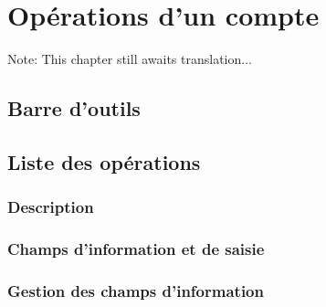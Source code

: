 
\chapter{Opérations d'un compte\label{transactions}}

Note: This chapter still awaits translation...


\section{Barre d'outils\label{transactions-functions}}


\section{Liste des opérations\label{transactions-list}}


\subsection{Description\label{transactions-list-description}}



\subsection{Champs d'information et de saisie\label{transactions-list-fields}}


\subsection{Gestion des champs d'information\label{transactions-list-fields-manage}}

